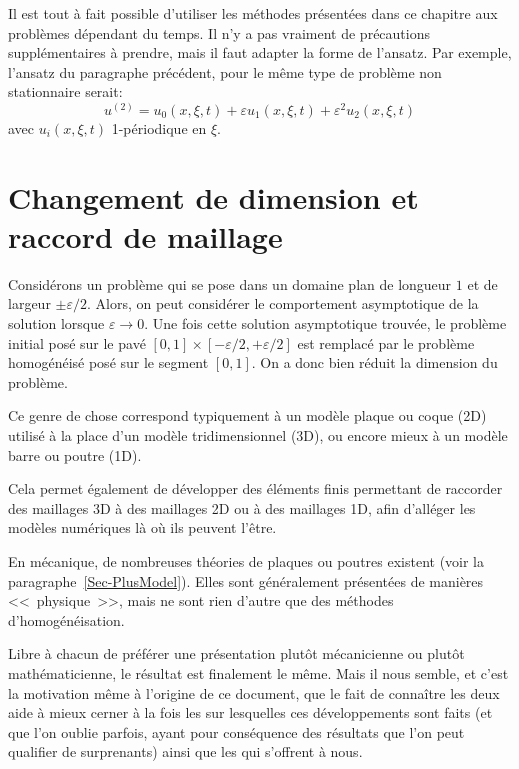 Il est tout à fait possible d'utiliser les méthodes présentées dans ce chapitre
aux problèmes dépendant du temps.
Il n'y a pas vraiment de précautions supplémentaires à prendre, mais il faut adapter la forme de l'ansatz.
Par exemple, l'ansatz du paragraphe précédent, pour le même type de problème
non stationnaire serait:
\begin{equation}u^{(2)} = u_0(x,\xi,t)+\varepsilon u_1(x,\xi,t) + \varepsilon^2 u_2(x,\xi,t)\end{equation}
avec $u_i(x,\xi,t)$ 1-périodique en $\xi$.

\medskip
\section{Changement de dimension et raccord de maillage}

\medskip
Considérons un problème qui se pose dans un domaine plan de longueur $1$ et de largeur $\pm\varepsilon/2$.
Alors, on peut considérer le comportement asymptotique de la solution lorsque $\varepsilon \longrightarrow 0$.
Une fois cette solution asymptotique trouvée, le problème initial posé sur le pavé
$[0,1]\times[-\varepsilon/2,+\varepsilon/2]$ est remplacé par le problème homogénéisé posé sur le segment $[0,1]$. On a donc bien réduit la dimension du problème.

\medskip
Ce genre de chose correspond typiquement à un modèle plaque ou coque (2D) utilisé à la place d'un modèle tridimensionnel (3D), ou encore mieux à un modèle barre ou poutre (1D).

Cela permet également de développer des éléments finis permettant de raccorder des maillages 3D à des maillages 2D ou à des maillages 1D, afin d'alléger les modèles numériques là où ils peuvent l'être.

\medskip
En mécanique, de nombreuses théories de plaques ou poutres existent (voir la paragraphe~\ref{Sec-PlusModel}). Elles sont généralement présentées de manières <<~physique~>>, mais ne sont rien d'autre que des méthodes d'homogénéisation.

Libre à chacun de préférer une présentation plutôt mécanicienne ou plutôt mathématicienne, le résultat est finalement le même. Mais il nous semble, et c'est la motivation même à l'origine de ce document, que le fait de connaître les deux aide à mieux cerner à la fois les  sur lesquelles ces développements sont faits (et que l'on oublie parfois, ayant pour conséquence des résultats que l'on peut qualifier de surprenants) ainsi que les  qui s'offrent à nous. 